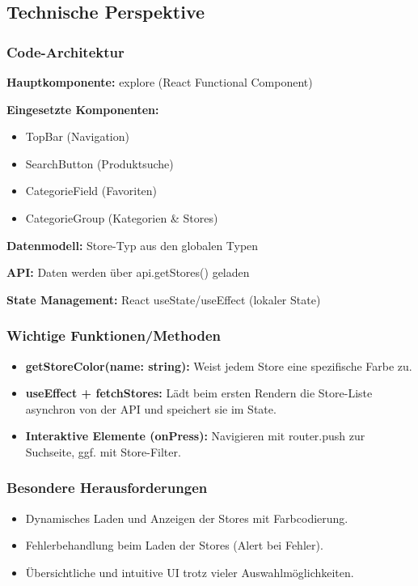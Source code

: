 \documentclass[12pt, a4paper]{report} %
\begin{document}
\subsection{Technische Perspektive}

\subsubsection{Code-Architektur}

\textbf{Hauptkomponente:} explore (React Functional Component)

\noindent\textbf{Eingesetzte Komponenten:}
\begin{itemize}
    \item TopBar (Navigation)
    \item SearchButton (Produktsuche)
    \item CategorieField (Favoriten)
    \item CategorieGroup (Kategorien \& Stores)
\end{itemize}

\noindent\textbf{Datenmodell:} Store-Typ aus den globalen Typen

\noindent\textbf{API:} Daten werden über api.getStores() geladen

\noindent\textbf{State Management:} React useState/useEffect (lokaler State)

\subsubsection{Wichtige Funktionen/Methoden}

\begin{itemize}
    \item \textbf{getStoreColor(name: string):} Weist jedem Store eine spezifische Farbe zu.
    \item \textbf{useEffect + fetchStores:} Lädt beim ersten Rendern die Store-Liste asynchron von der API und speichert sie im State.
    \item \textbf{Interaktive Elemente (onPress):} Navigieren mit router.push zur Suchseite, ggf. mit Store-Filter.
\end{itemize}

\subsubsection{Besondere Herausforderungen}
\begin{itemize}
    \item Dynamisches Laden und Anzeigen der Stores mit Farbcodierung.
    \item Fehlerbehandlung beim Laden der Stores (Alert bei Fehler).
    \item Übersichtliche und intuitive UI trotz vieler Auswahlmöglichkeiten.
\end{itemize}
\end{document}
